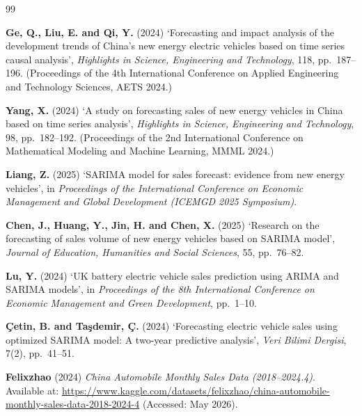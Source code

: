\documentclass[12pt]{article}
\begin{document}
\newpage

\begin{thebibliography}{99}
\setlength\itemsep{0.4em}

\textbf{Ge, Q., Liu, E. and Qi, Y.} (2024) `Forecasting and impact analysis of the development trends of China's new energy electric vehicles based on time series causal analysis',
\textit{Highlights in Science, Engineering and Technology}, 118, pp.~187--196.
(Proceedings of the 4th International Conference on Applied Engineering and Technology Sciences, AETS 2024.)

\textbf{Yang, X.} (2024) `A study on forecasting sales of new energy vehicles in China based on time series analysis',
\textit{Highlights in Science, Engineering and Technology}, 98, pp.~182--192.
(Proceedings of the 2nd International Conference on Mathematical Modeling and Machine Learning, MMML 2024.)

\textbf{Liang, Z.} (2025) `SARIMA model for sales forecast: evidence from new energy vehicles',
in \textit{Proceedings of the International Conference on Economic Management and Global Development (ICEMGD 2025 Symposium)}.

\textbf{Chen, J., Huang, Y., Jin, H. and Chen, X.} (2025) `Research on the forecasting of sales volume of new energy vehicles based on SARIMA model',
\textit{Journal of Education, Humanities and Social Sciences}, 55, pp.~76--82.

\textbf{Lu, Y.} (2024) `UK battery electric vehicle sales prediction using ARIMA and SARIMA models',
in \textit{Proceedings of the 8th International Conference on Economic Management and Green Development}, pp.~1--10.

\textbf{\c{C}etin, B. and Ta\c{s}demir, \c{C}.} (2024) `Forecasting electric vehicle sales using optimized SARIMA model: A two-year predictive analysis',
\textit{Veri Bilimi Dergisi}, 7(2), pp.~41--51.

\textbf{Felixzhao} (2024) \textit{China Automobile Monthly Sales Data (2018--2024.4)}. Available at: \url{https://www.kaggle.com/datasets/felixzhao/china-automobile-monthly-sales-data-2018-2024-4} (Accessed: May 2026).

\end{thebibliography}
\end{document}
